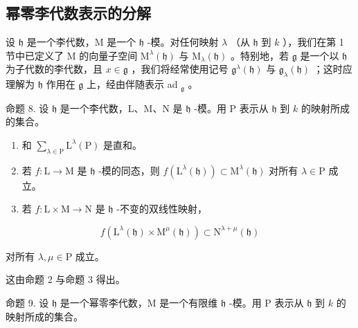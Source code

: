 \subsection{幂零李代数表示的分解}

设 \(\mathfrak{h}\) 是一个李代数，M 是一个 \(\mathfrak{h}\) -模。对任何映射 \(\lambda\) （从 \(\mathfrak{h}\) 到 \(k\) ），我们在第 1 节中已定义了 M 的向量子空间 \(\mathrm{M}^{\lambda}(\mathfrak{h})\) 与 \(\mathrm{M}_{\lambda}(\mathfrak{h})\) 。特别地，若 \(\mathfrak{g}\) 是一个以 \(\mathfrak{h}\) 为子代数的李代数，且 \(x \in \mathfrak{g}\) ，我们将经常使用记号 \(\mathfrak{g}^{\lambda}(\mathfrak{h})\) 与 \(\mathfrak{g}_{\lambda}(\mathfrak{h})\) ；这时应理解为 \(\mathfrak{h}\) 作用在 \(\mathfrak{g}\) 上，经由伴随表示 ad \(_{\mathfrak{g}}\) 。

命题 8. 设 \(\mathfrak{h}\) 是一个李代数，L、M、N 是 \(\mathfrak{h}\) -模。用 P 表示从 \(\mathfrak{h}\) 到 \(k\) 的映射所成的集合。

\begin{enumerate}
\def\labelenumi{(\roman{enumi})}
\item
  和 \(\sum_{\lambda \in \mathrm{P}}\mathrm{L}^{\lambda}(\mathrm{P})\) 是直和。
\item
  若 \(f: \mathrm{L} \to \mathrm{M}\) 是 \(\mathfrak{h}\) -模的同态，则 \(f(\mathrm{L}^{\lambda}(\mathfrak{h})) \subset \mathrm{M}^{\lambda}(\mathfrak{h})\) 对所有 \(\lambda \in \mathrm{P}\) 成立。
\item
  若 \(f:\mathrm{L}\times \mathrm{M}\to \mathrm{N}\) 是 \(\mathfrak{h}\) -不变的双线性映射，
\end{enumerate}

\[
f (\mathrm{L} ^ {\lambda} (\mathfrak {h}) \times \mathrm{M} ^ {\mu} (\mathfrak {h})) \subset \mathrm{N} ^ {\lambda + \mu} (\mathfrak {h})
\]

对所有 \(\lambda, \mu \in \mathrm{P}\) 成立。

这由命题 2 与命题 3 得出。

命题 9. 设 \(\mathfrak{h}\) 是一个幂零李代数，M 是一个有限维 \(\mathfrak{h}\) -模。用 P 表示从 \(\mathfrak{h}\) 到 \(k\) 的映射所成的集合。

